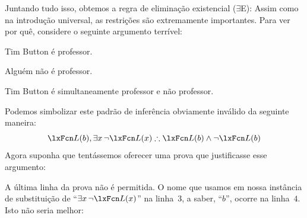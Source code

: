 Juntando tudo isso, obtemos a regra de eliminação existencial ($\exists$E):
Assim como na introdução universal, as restrições são extremamente importantes. Para ver por quê, considere o seguinte argumento terrível:
	\begin{earg}
\item Tim Button é professor.
\item Alguém não é professor.
\item[\texttherefore] Tim Button é simultaneamente professor e não professor.
	\end{earg}
Podemos simbolizar este padrão de inferência obviamente inválido da seguinte maneira:
$$\atom{L}{b}, \exists x\, \enot\atom{L}{x} \therefore \atom{L}{b} \eand \enot \atom{L}{b}$$
Agora suponha que tentássemos oferecer uma prova que justificasse esse argumento:
\begin{fitchproof}
	\PR
	\PR
	\open
		\AS
	\close
\ifHTMLtarget
{}

\else
\fi
\end{fitchproof}
A última linha da prova não é permitida. O nome que usamos em nossa instância de substituição de \textquotedblleft $\exists x\, \enot \atom{L}{x}$\textquotedblright{} na linha~$3$, a saber, \textquotedblleft $b$\textquotedblright{}, ocorre na linha~$4$. Isto não seria melhor:
\begin{fitchproof}
	\PR
	\PR
	\open
		\AS
	\close
\ifHTMLtarget
{}

\else
{}
\fi
\end{fitchproof}
